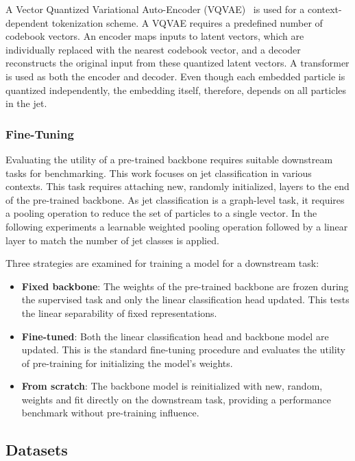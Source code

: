 A Vector Quantized Variational Auto-Encoder (VQVAE)~\cite{VQVAE} is used for a context-dependent tokenization scheme.
A VQVAE requires a predefined number of codebook vectors.
An encoder maps inputs to latent vectors, which are individually replaced with the nearest codebook vector, and a decoder reconstructs the original input from these quantized latent vectors.
A transformer is used as both the encoder and decoder.
Even though each embedded particle is quantized independently, the embedding itself, therefore, depends on all particles in the jet.

\subsubsection{Fine-Tuning}
\label{subsec:fine-tune}

Evaluating the utility of a pre-trained backbone requires suitable downstream tasks for benchmarking.
This work focuses on jet classification in various contexts.
This task requires attaching new, randomly initialized, layers to the end of the pre-trained backbone.
As jet classification is a graph-level task, it requires a pooling operation to reduce the set of particles to a single vector.
In the following experiments a learnable weighted pooling operation followed by a linear layer to match the number of jet classes is applied.

Three strategies are examined for training a model for a downstream task:

\begin{itemize}
    \item \textbf{Fixed backbone}: The weights of the pre-trained backbone are frozen during the supervised task and only the linear classification head updated. This tests the linear separability of fixed representations.
    \item \textbf{Fine-tuned}: Both the linear classification head and backbone model are updated. This is the standard fine-tuning procedure and evaluates the utility of pre-training for initializing the model's weights.
    \item \textbf{From scratch}: The backbone model is reinitialized with new, random, weights and fit directly on the downstream task, providing a performance benchmark without pre-training influence.
\end{itemize}

\subsection{Datasets}
\label{sec:mpm_data}

